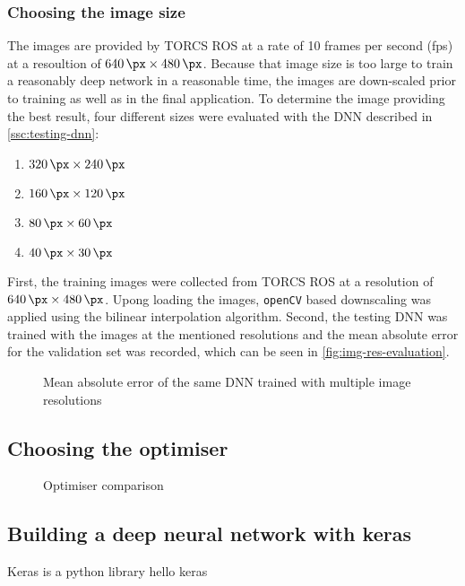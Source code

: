\documentclass[10pt,a4paper,twoside,journal]{IEEEtran}
\begin{document}
\subsubsection{Choosing the image size}
The images are provided by TORCS ROS \cite{mirus_torcs} at a rate of 10 frames per second (fps) at a resoultion of $ \SI{640}{\px} \times \SI{480}{\px} $. Because that image size is too large
to train a reasonably deep network in a reasonable time, the images are down-scaled prior to training as well as in the final application. To determine the image providing the best result, four different sizes were evaluated with the DNN described in \autoref{ssc:testing-dnn}: 
\begin{enumerate}
	\item $ \SI{320}{\px} \times \SI{240}{\px} $
	\item $ \SI{160}{\px} \times \SI{120}{\px} $
	\item $ \SI{80}{\px} \times \SI{60}{\px} $
	\item $ \SI{40}{\px} \times \SI{30}{\px} $
\end{enumerate}
First, the training images were collected from TORCS ROS at a resolution of $ \SI{640}{\px}\times \SI{480}{\px}$. Upong loading the images, \texttt{openCV} based downscaling was applied using the bilinear interpolation algorithm. Second, the testing DNN was trained with the images at the mentioned resolutions and the mean absolute error 
for the validation set was recorded, which can be seen in \autoref{fig:img-res-evaluation}.
\begin{figure}
	\centering
	
	\caption{Mean absolute error of the same DNN trained with multiple image resolutions}
	\label{fig:img-res-evaluation}
\end{figure}

\subsection{Choosing the optimiser}
\label{sc:optimiser-choice}

\begin{figure}
	\centering
	
	\caption{Optimiser comparison}
	\label{fig:optimiser-evaluation}
\end{figure}

\subsection{Building a deep neural network with keras}
\label{ssc:keras}
Keras is a python library 
hello keras \cite{Toshev_2014_CVPR}
\end{document}
